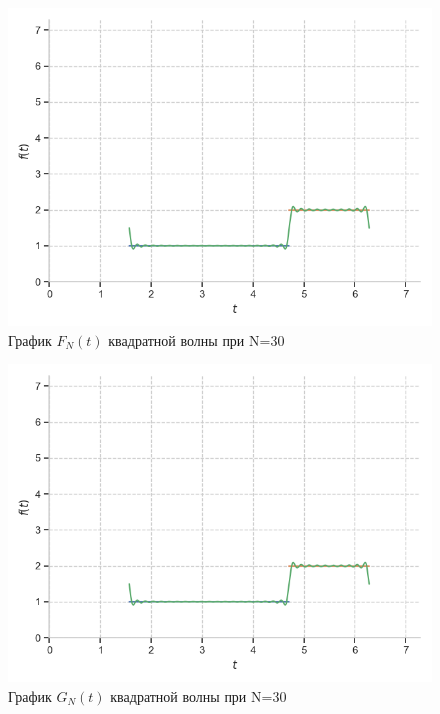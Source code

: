 \documentclass[a4paper, 16pt]{article}
\begin{document}
\begin{figure}[!htb]
    \centering
    \includegraphics[scale=0.8]{fur_sqwave_n=30.png}
    \captionsetup{skip=0pt}
    \caption{График $F_N(t)$ квадратной волны при N=30}
    \label{Рис:6}
\end{figure}
\begin{figure}[!htb]
    \centering
    \includegraphics[scale=0.8]{cfur_sqwave_n=30.png}
    \captionsetup{skip=0pt}
    \caption{График $G_N(t)$ квадратной волны при N=30}
    \label{Рис:7}
\end{figure}
\newpage
\vspace*{10mm}
\end{document}
